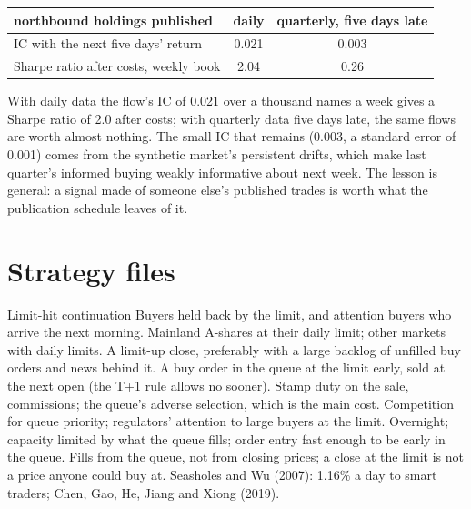 \begin{center}
\small
\begin{tabular}{@{}lcc@{}}
\toprule
northbound holdings published & daily & quarterly, five days late\\
\midrule
IC with the next five days' return & 0.021 & 0.003\\
Sharpe ratio after costs, weekly book & 2.04 & 0.26\\
\bottomrule
\end{tabular}
\end{center}

With daily data the flow's IC of 0.021 over a thousand names a week gives a Sharpe ratio of 2.0 after costs; with quarterly data five days late,
the same flows are worth almost nothing. The small IC that remains (0.003, a standard error of 0.001) comes from the synthetic market's persistent
drifts, which make last quarter's informed buying weakly informative about next week. The lesson is general: a signal made of someone else's
published trades is worth what the publication schedule leaves of it.

\section{Strategy files}

\begin{strategyfile}{Limit-hit continuation}\label{strat:s1:asia-specific-equity-strategies:limit}
 Buyers held back by the limit, and attention buyers who arrive the next morning.
 Mainland A-shares at their daily limit; other markets with daily limits.
 A limit-up close, preferably with a large backlog of unfilled buy orders and news behind it.
 A buy order in the queue at the limit early, sold at the next open (the T+1 rule allows no sooner).
 Stamp duty on the sale, commissions; the queue's adverse selection, which is the main cost.
 Competition for queue priority; regulators' attention to large buyers at the limit.
 Overnight; capacity limited by what the queue fills; order entry fast enough to be early in the queue.
 Fills from the queue, not from closing prices; a close at the limit is not a price anyone could buy at.
 Seasholes and Wu (2007): 1.16\% a day to smart traders; Chen, Gao, He, Jiang and Xiong (2019).
\end{strategyfile}

